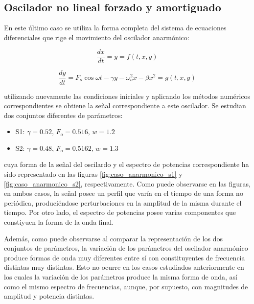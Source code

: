 \documentclass[11pt]{article}
\begin{document}
\subsection{Oscilador no lineal forzado y amortiguado}
En este último caso se utiliza la forma completa del sistema de ecuaciones diferenciales que rige el movimiento del oscilador anarmónico:

\begin{equation}
	\frac{dx}{dt} = y = f(t, x, y)
\end{equation}

\begin{equation}
	\frac{dy}{dt} = F_{o}\cos{\omega{}t} -\gamma{}y - \omega_{o}^2x - \beta{}x^2 = g(t, x, y) 	
\end{equation}

utilizando nuevamente las condiciones iniciales y aplicando los métodos numéricos correspondientes se obtiene la señal correspondiente a este oscilador. Se estudian dos conjuntos diferentes de parámetros:

\begin{itemize}
	\item S1: $\gamma = 0.52$, $F_o = 0.516$, $w = 1.2$
	\item S2: $\gamma = 0.48$, $F_o = 0.5162$, $w = 1.3$
\end{itemize}

cuya forma de la señal del oscilardo y el espectro de potencias correspondiente ha sido representado en las figuras \ref{fig:caso_anarmonico_s1} y \ref{fig:caso_anarmonico_s2}, respectivamente. Como puede observarse en las figuras, en ambos casos, la señal posee un perfil que varía en el tiempo de una forma no periódica, produciéndose perturbaciones en la amplitud de la misma durante el tiempo. Por otro lado, el espectro de potencias posee varias componentes que constiyuen la forma de la onda final. 

Además, como puede observarse al comparar la representación de los dos conjuntos de parámetros, la variación de los parámetros del oscilador anarmónico produce formas de onda muy diferentes entre sí con constituyentes de frecuencia distintas muy distintas. Esto no ocurre en los casos estudiados anteriormente en los cuales la variación de los parámetros produce la misma forma de onda, así como el mismo espectro de frecuencias, aunque, por supuesto, con magnitudes de amplitud y potencia distintas.
\end{document}
